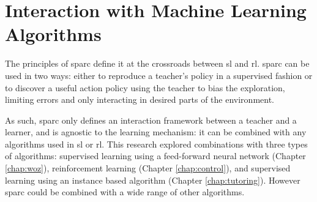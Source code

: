 

\section{Interaction with Machine Learning Algorithms}

The principles of \gls{sparc} define it at the crossroads between \gls{sl} and \gls{rl}. \gls{sparc} can be used in two ways: either to reproduce a teacher's policy in a supervised fashion or to discover a useful action policy using the teacher to bias the exploration, limiting errors and only interacting in desired parts of the environment.

As such, \gls{sparc} only defines an interaction framework between a teacher and a learner, and is agnostic to the learning mechanism: it can be combined with any algorithms used in \gls{sl} or \gls{rl}. This research explored combinations with three types of algorithms: supervised learning using a feed-forward neural network (Chapter \ref{chap:woz}), reinforcement learning (Chapter \ref{chap:control}), and supervised learning using an instance based algorithm (Chapter \ref{chap:tutoring}). However \gls{sparc} could be combined with a wide range of other algorithms.


